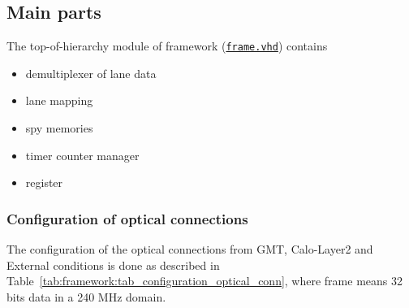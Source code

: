 \clearpage

\subsection{Main parts}

The top-of-hierarchy module of framework (\href{\gitbranch/firmware/hdl/payload/frame.vhd}{\texttt{\textquotesingle frame.vhd\textquotesingle }}) contains
\begin {itemize}
\item demultiplexer of lane data
\item lane mapping
\item spy memories
\item timer counter manager
\item register
\end {itemize}

\subsubsection{Configuration of optical connections} \label{sec:framework:sec_configuration_optical_conn}
The configuration of the optical connections from GMT, Calo-Layer2 and External conditions is done as described in Table~\ref{tab:framework:tab_configuration_optical_conn}, where frame means 32 bits data in a 240 MHz domain.

